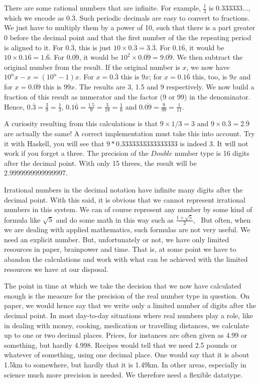 \documentclass[tikz]{scrreprt}
\newcommand{\Conid}[1]{\mathit{#1}}
\begin{document}
There are some rational numbers that are infinite.
For example, $\frac{1}{3}$ is $0.333333\dots$,
which we encode as $0.\overline{3}$.
Such periodic decimals are easy to convert
to fractions. We just have to multiply them
by a power of 10, such that there is a part
greater 0 before the decimal point and
that the first number
of the the repeating period is aligned to it.
For $0.\overline{3}$, 
this is just $10\times 0.\overline{3} = 3.\overline{3}$.
For $0.1\overline{6}$,
it would be $10\times 0.1\overline{6} = 1.\overline{6}$.
For $0.\overline{09}$,
it would be $10^2\times 0.\overline{09} = 9.\overline{09}$.
We then subtract the original number from the result.
If the original number is $x$, we now have 
$10^nx - x = (10^n-1)x$.
For $x=0.\overline{3}$ this is $9x$;
for $x=0.1\overline{6}$ this, too, is $9x$ and
for $x=0.\overline{09}$ this is $99x$.
The results are 3, 1.5 and 9 respectively.
We now build a fraction of this result as numerator
and the factor (9 or 99) in the denominator.
Hence, $0.\overline{3} = \frac{3}{9} = \frac{1}{3}$,
$0.1\overline{6} = \frac{1.5}{9} = \frac{3}{18} = \frac{1}{6}$ and
$0.\overline{09} = \frac{9}{99} = \frac{1}{11}$.

A curiosity resulting from this calculations
is that $9\times 1/3 = 3$ and 
$9 \times 0.\overline{3} = 2.\overline{9}$
are actually the same! A correct implementation
must take this into account.
Try it with Haskell, you will see that
\ensuremath{\mathrm{9}\mathbin{*}\mathrm{0.3333333333333333}} is indeed 3.
It will not work if you forget a three.
The precision of the \ensuremath{\Conid{Double}} number type is 16
digits after the decimal point. With only 15 threes,
the result will be 2.9999999999999997.

Irrational numbers in the decimal notation
have infinite many digits after the decimal point.
With this said, it is obvious that we cannot
represent irrational numbers in this system.
We can of course represent any number by some
kind of formula like $\sqrt{5}$ and do some
math in this way such as $\frac{1+\sqrt{5}}{2}$,
\etc\ But often, when we are dealing with
applied mathematics, such formulas are not
very useful. We need an explicit number.
But, unfortunately or not, we have only
limited resources in paper, brainpower and
time. That is, at some point we have to 
abandon the calculations and work with what
can be achieved with the limited resources
we have at our disposal.

The point in time at which we take
the decision that we now have calculated
enough is the measure for the precision
of the real number type in question.
On paper, we would hence say that we
write only a limited number of digits
after the decimal point. In most day-to-day
situations where real numbers play a role,
like in dealing with money, cooking,
medication or travelling distances,
we calculate up to one or two decimal places.
Prices, for instances are often given 
as 4.99 or something, but hardly 4.998.
Recipes would tell that we need 2.5 pounds
or whatever of something, using one decimal place.
One would say that it is about 1.5km 
to somewhere, but hardly that it is 1.49km.
In other areas, especially in science 
much more precision is needed.
We therefore need a flexible datatype.
\end{document}
